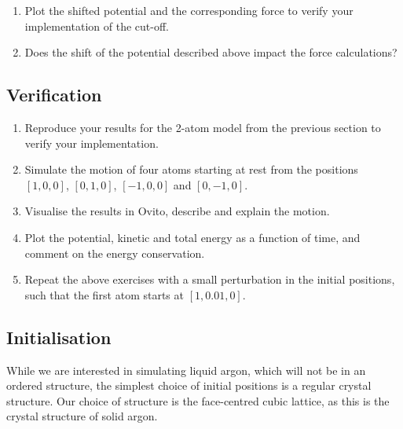 \documentclass[11pt,british,a4paper]{report}
\begin{document}
\begin{enumerate}[label=\roman*., resume]
    \item Plot the shifted potential and the corresponding force to verify your implementation of the cut-off.
    \item Does the shift of the potential described above impact the force calculations?
\end{enumerate}

\subsection{Verification}
\begin{enumerate}[label=\roman*.]
     \item Reproduce your results for the 2-atom model from the previous section to verify your implementation.
    \item Simulate the motion of four atoms starting at rest from the positions \([1,0,0]\), \([0,1,0]\), \([-1,0,0]\) and \([0,-1,0]\).
    \item Visualise the results in Ovito, describe and explain the motion.
    \item Plot the potential, kinetic and total energy as a function of time, and comment on the energy conservation.
    \item Repeat the above exercises with a small perturbation in the initial positions, such that the first atom starts at \([1,0.01,0]\).
\end{enumerate}

\subsection{Initialisation}
While we are interested in simulating liquid argon, which will not be in an ordered structure, the simplest choice of initial positions is a regular crystal structure. Our choice of structure is the face-centred cubic lattice, as this is the crystal structure of solid argon.
\end{document}

